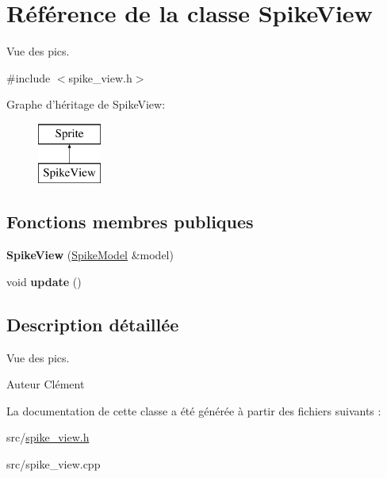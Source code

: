 \hypertarget{class_spike_view}{\section{Référence de la classe Spike\+View}
\label{class_spike_view}
}


Vue des pics.  




{\ttfamily \#include $<$spike\+\_\+view.\+h$>$}

Graphe d'héritage de Spike\+View\+:\begin{figure}[H]
\begin{center}
\leavevmode
\includegraphics[height=2.000000cm]{class_spike_view}
\end{center}
\end{figure}
\subsection*{Fonctions membres publiques}
\begin{DoxyCompactItemize}
\item 
\hypertarget{class_spike_view_a37d3f7f6bf70068b3415ecf6b2d39656}{{\bfseries Spike\+View} (\hyperlink{class_spike_model}{Spike\+Model} \&model)}\label{class_spike_view_a37d3f7f6bf70068b3415ecf6b2d39656}

\item 
\hypertarget{class_spike_view_a3d4f13df4fb97637811af700ca44e7ef}{void {\bfseries update} ()}\label{class_spike_view_a3d4f13df4fb97637811af700ca44e7ef}

\end{DoxyCompactItemize}


\subsection{Description détaillée}
Vue des pics. 

\begin{DoxyAuthor}{Auteur}
Clément 
\end{DoxyAuthor}


La documentation de cette classe a été générée à partir des fichiers suivants \+:\begin{DoxyCompactItemize}
\item 
src/\hyperlink{spike__view_8h}{spike\+\_\+view.\+h}\item 
src/spike\+\_\+view.\+cpp\end{DoxyCompactItemize}
